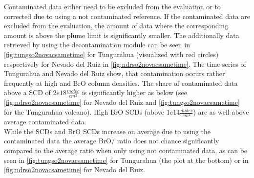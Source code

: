 \documentclass  [
  paper    = a4,
  BCOR     = 10mm,
  twoside,
  fontsize = 12pt,
  fleqn,
  toc      = bibnumbered,
  toc      = listofnumbered,
  numbers  = noendperiod,
  headings = normal,
  listof   = leveldown,
  version  = 3.03
]                                       {scrreprt}
\begin{document}
	Contaminated data either need to be excluded from the evaluation or to corrected due to using a not contaminated reference. If the contaminated data are excluded from the evaluation, the amount of data where the corresponding  amount is above the plume limit is significantly smaller. The additionally data retrieved by using the decontamination module can be seen in \cref{fig:tungso2novacsametime} for Tungurahua (visualized with red circles) respectively for Nevado del Ruiz in \cref{fig:ndrso2novacsametime}.
	The time series of Tungurahua and Nevado del Ruiz show, that contamination occurs rather frequently at high  and BrO column densities. The share of contaminated data above a  SCD of $2e18\frac{molec}{cm^2}$ is significantly higher as below (see \cref{fig:ndrso2novacsametime} for Nevado del Ruiz and \cref{fig:tungso2novacsametime} for the Tungurahua volcano). High BrO SCDs (above $1e14\frac{molec}{cm^2}$) are as well above average contaminated data.\\
	While the  SCDs and BrO SCDs increase on average due to using the contaminated data the average BrO/ ratio does not chance significantly compared to the average ratio when only using not contaminated data, as can be seen in \cref{fig:tungso2novacsametime} for Tungurahua (the plot at the bottom) or in \cref{fig:ndrso2novacsametime} for Nevado del Ruiz.\\

	
	
\end{document}
